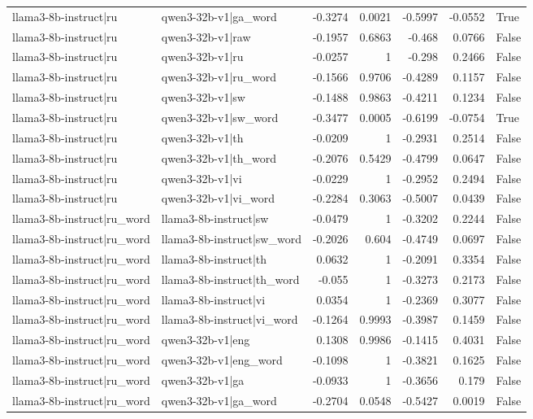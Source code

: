 \begin{table}
\begin{tabular}{l l r r r r l}
llama3-8b-instruct|ru & qwen3-32b-v1|ga_word & -0.3274 & 0.0021 & -0.5997 & -0.0552 & True \\
llama3-8b-instruct|ru & qwen3-32b-v1|raw & -0.1957 & 0.6863 & -0.468 & 0.0766 & False \\
llama3-8b-instruct|ru & qwen3-32b-v1|ru & -0.0257 & 1 & -0.298 & 0.2466 & False \\
llama3-8b-instruct|ru & qwen3-32b-v1|ru_word & -0.1566 & 0.9706 & -0.4289 & 0.1157 & False \\
llama3-8b-instruct|ru & qwen3-32b-v1|sw & -0.1488 & 0.9863 & -0.4211 & 0.1234 & False \\
llama3-8b-instruct|ru & qwen3-32b-v1|sw_word & -0.3477 & 0.0005 & -0.6199 & -0.0754 & True \\
llama3-8b-instruct|ru & qwen3-32b-v1|th & -0.0209 & 1 & -0.2931 & 0.2514 & False \\
llama3-8b-instruct|ru & qwen3-32b-v1|th_word & -0.2076 & 0.5429 & -0.4799 & 0.0647 & False \\
llama3-8b-instruct|ru & qwen3-32b-v1|vi & -0.0229 & 1 & -0.2952 & 0.2494 & False \\
llama3-8b-instruct|ru & qwen3-32b-v1|vi_word & -0.2284 & 0.3063 & -0.5007 & 0.0439 & False \\
llama3-8b-instruct|ru_word & llama3-8b-instruct|sw & -0.0479 & 1 & -0.3202 & 0.2244 & False \\
llama3-8b-instruct|ru_word & llama3-8b-instruct|sw_word & -0.2026 & 0.604 & -0.4749 & 0.0697 & False \\
llama3-8b-instruct|ru_word & llama3-8b-instruct|th & 0.0632 & 1 & -0.2091 & 0.3354 & False \\
llama3-8b-instruct|ru_word & llama3-8b-instruct|th_word & -0.055 & 1 & -0.3273 & 0.2173 & False \\
llama3-8b-instruct|ru_word & llama3-8b-instruct|vi & 0.0354 & 1 & -0.2369 & 0.3077 & False \\
llama3-8b-instruct|ru_word & llama3-8b-instruct|vi_word & -0.1264 & 0.9993 & -0.3987 & 0.1459 & False \\
llama3-8b-instruct|ru_word & qwen3-32b-v1|eng & 0.1308 & 0.9986 & -0.1415 & 0.4031 & False \\
llama3-8b-instruct|ru_word & qwen3-32b-v1|eng_word & -0.1098 & 1 & -0.3821 & 0.1625 & False \\
llama3-8b-instruct|ru_word & qwen3-32b-v1|ga & -0.0933 & 1 & -0.3656 & 0.179 & False \\
llama3-8b-instruct|ru_word & qwen3-32b-v1|ga_word & -0.2704 & 0.0548 & -0.5427 & 0.0019 & False \\

\end{tabular}
\end{table}

